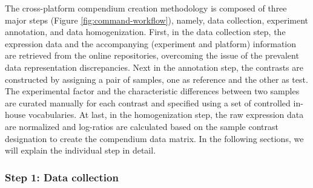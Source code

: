 The cross-platform compendium creation methodology is composed of three major
steps (Figure \ref{fig:command-workflow}), namely, data collection, experiment
annotation, and data homogenization.
%
First, in the data collection step, the expression data and the accompanying
(experiment and platform) information are retrieved from the online
repositories, overcoming the issue of the prevalent data representation
discrepancies.
%
Next in the annotation step, the contrasts are constructed by assigning a pair of
samples, one as reference and the other as test.  The experimental factor and
the characteristic differences between two samples are curated manually for
each contrast and specified using a set of controlled in-house vocabularies.
%
At last, in the homogenization step, the raw expression data are normalized
and log-ratios are calculated based on the sample contrast designation to
create the compendium data matrix.
%
In the following sections, we will explain the individual step in detail.






\subsubsection{Step 1: Data collection}




